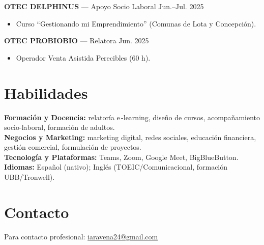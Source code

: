 \documentclass[a4paper,10pt]{article}
\begin{document}
\vspace{0.8em}
\textbf{OTEC DELPHINUS} — Apoyo Socio Laboral \hfill Jun.–Jul. 2025\\[-0.3em]
\begin{itemize}
  \item Curso “Gestionando mi Emprendimiento” (Comunas de Lota y Concepción).
\end{itemize}

\vspace{0.8em}
\textbf{OTEC PROBIOBIO} — Relatora \hfill Jun. 2025\\[-0.3em]
\begin{itemize}
  \item Operador Venta Asistida Perecibles (60 h).
\end{itemize}

\vspace{1em}
\section*{Habilidades}
\textbf{Formación y Docencia:} relatoría e\,-learning, diseño de cursos, acompañamiento socio-laboral, formación de adultos.\\[3pt]
\textbf{Negocios y Marketing:} marketing digital, redes sociales, educación financiera, gestión comercial, formulación de proyectos.\\[3pt]
\textbf{Tecnología y Plataformas:} Teams, Zoom, Google Meet, BigBlueButton.\\[3pt]
\textbf{Idiomas:} Español (nativo); Inglés (TOEIC/Comunicacional, formación UBB/Tronwell).

\vspace{1em}
\section*{Contacto}
Para contacto profesional: \href{mailto:iaravena24@gmail.com}{iaravena24@gmail.com}
\end{document}
